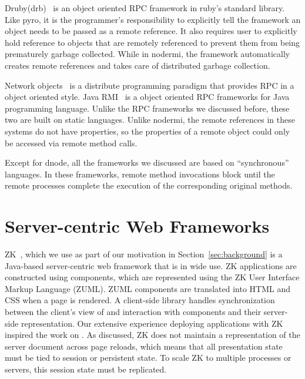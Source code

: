 Druby(drb)~\cite{druby} is an object oriented RPC framework in ruby's standard
library. Like pyro, it is the programmer's responsibility to explicitly tell
the framework an object needs to be passed as a remote reference. It also
requires user to explicitly hold reference  to objects that are remotely
referenced  to prevent them from being prematurely garbage collected. While in
nodermi, the framework automatically creates remote references and takes care
of distributed garbage collection.



Network objects~\cite{birrell1993distributed} is a distribute programming
paradigm that provides RPC in a object oriented style. Java RMI~\cite{j2eedoc}
is a object oriented RPC frameworks for Java programming language. Unlike the
RPC frameworks we discussed before, these two are built on static languages.
Unlike nodermi, the remote references in these systems do not have properties,
so the properties of a remote object could only be accessed via remote method
calls.


Except for dnode, all the frameworks we discussed  are based on
``synchronous'' languages. In these frameworks, remote method invocations
block until  the remote processes complete the execution of the  corresponding
original methods.




\section{Server-centric Web Frameworks}

ZK~\cite{ChenCheng:book2007},
which we use as part of our motivation in Section~\ref{sec:background}
is a Java-based server-centric web framework that is in wide use.
ZK applications are constructed using components, which are represented
using the ZK User Interface Markup Language (ZUML).  ZUML components
are translated into HTML and CSS when a page is rendered.
A client-side library handles synchronization between the client's 
view of and interaction with components and their server-side 
representation.  Our extensive experience deploying applications
with ZK~\cite{Tilevich:aop2008,EdwardsBack:csc2011} inspired the 
work on \cb.  As discussed, ZK does not maintain a representation
of the server document across page reloads, which means that
all presentation state must be tied to session or persistent state.
To scale ZK to multiple processes or servers, this session state must
be replicated.

